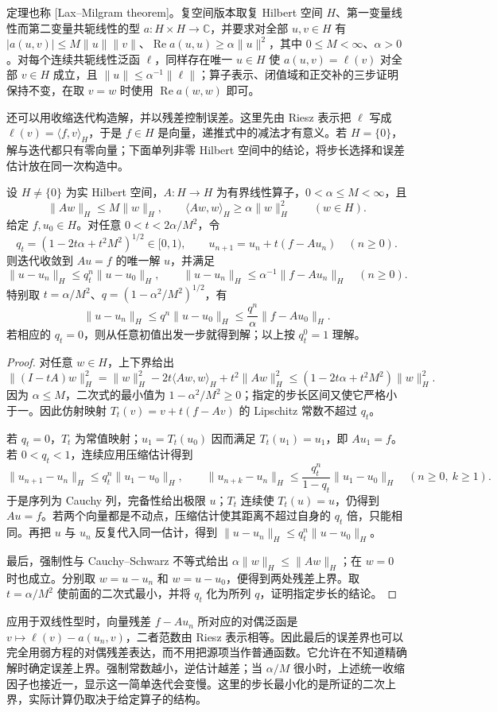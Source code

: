 定理也称 [Lax--Milgram theorem]。复空间版本取复 Hilbert 空间 \(H\)、第一变量线性而第二变量共轭线性的型 \(a:H\times H\to\mathbb C\)，并要求对全部 \(u,v\in H\) 有 \(|a(u,v)|\le M\|u\|\|v\|\)、\(\operatorname{Re}a(u,u)\ge\alpha\|u\|^2\)，其中 \(0\le M<\infty\)、\(\alpha>0\)。对每个连续共轭线性泛函 \(\ell\)，同样存在唯一 \(u\in H\) 使 \(a(u,v)=\ell(v)\) 对全部 \(v\in H\) 成立，且 \(\|u\|\le\alpha^{-1}\|\ell\|\)；算子表示、闭值域和正交补的三步证明保持不变，在取 \(v=w\) 时使用 \(\operatorname{Re}a(w,w)\) 即可。

\ProseParagraphBreak

还可以用收缩迭代构造解，并以残差控制误差。这里先由 Riesz 表示把 \(\ell\) 写成 \(\ell(v)=\langle f,v\rangle_H\)，于是 \(f\in H\) 是向量，递推式中的减法才有意义。若 \(H=\{0\}\)，解与迭代都只有零向量；下面单列非零 Hilbert 空间中的结论，将步长选择和误差估计放在同一次构造中。

\begin{proposition}[收缩迭代与残差估计]
\label{b2:prop:15-contraction-residual}
设 \(H\ne\{0\}\) 为实 Hilbert 空间，\(A:H\to H\) 为有界线性算子，\(0<\alpha\leq M<\infty\)，且
\[
 \|Aw\|_H\leq M\|w\|_H,\qquad
 \langle Aw,w\rangle_H\geq\alpha\|w\|_H^2
 \qquad(w\in H).
\]
给定 \(f,u_0\in H\)。对任意 \(0<t<2\alpha/M^2\)，令
\[
 q_t=(1-2t\alpha+t^2M^2)^{1/2}\in[0,1),\qquad
 u_{n+1}=u_n+t(f-Au_n)\quad(n\geq0).
\]
则迭代收敛到 \(Au=f\) 的唯一解 \(u\)，并满足
\[
 \|u-u_n\|_H\leq q_t^n\|u-u_0\|_H,\qquad
 \|u-u_n\|_H\leq\alpha^{-1}\|f-Au_n\|_H
 \quad(n\geq0).
\]
特别取 \(t=\alpha/M^2\)、\(q=(1-\alpha^2/M^2)^{1/2}\)，有
\[
 \|u-u_n\|_H\leq q^n\|u-u_0\|_H
               \leq\frac{q^n}{\alpha}\|f-Au_0\|_H.
\]
若相应的 \(q_t=0\)，则从任意初值出发一步就得到解；以上按 \(q_t^0=1\) 理解。
\end{proposition}
\begin{proof}
对任意 \(w\in H\)，上下界给出
\[
 \|(I-tA)w\|_H^2
 =\|w\|_H^2-2t\langle Aw,w\rangle_H+t^2\|Aw\|_H^2
 \leq(1-2t\alpha+t^2M^2)\|w\|_H^2.
\]
因为 \(\alpha\leq M\)，二次式的最小值为 \(1-\alpha^2/M^2\geq0\)；指定的步长区间又使它严格小于一。因此仿射映射
\(T_t(v)=v+t(f-Av)\) 的 Lipschitz 常数不超过 \(q_t\)。

若 \(q_t=0\)，\(T_t\) 为常值映射；\(u_1=T_t(u_0)\) 因而满足 \(T_t(u_1)=u_1\)，即 \(Au_1=f\)。若 \(0<q_t<1\)，连续应用压缩估计得到
\[
 \|u_{n+1}-u_n\|_H\leq q_t^n\|u_1-u_0\|_H,\qquad
 \|u_{n+k}-u_n\|_H
 \leq\frac{q_t^n}{1-q_t}\|u_1-u_0\|_H
 \quad(n\geq0,\ k\geq1).
\]
于是序列为 Cauchy 列，完备性给出极限 \(u\)；\(T_t\) 连续使 \(T_t(u)=u\)，仍得到 \(Au=f\)。若两个向量都是不动点，压缩估计使其距离不超过自身的 \(q_t\) 倍，只能相同。再把 \(u\) 与 \(u_n\) 反复代入同一估计，得到 \(\|u-u_n\|_H\leq q_t^n\|u-u_0\|_H\)。

最后，强制性与 Cauchy--Schwarz 不等式给出
\(\alpha\|w\|_H\leq\|Aw\|_H\)；在 \(w=0\) 时也成立。分别取 \(w=u-u_n\) 和 \(w=u-u_0\)，便得到两处残差上界。取 \(t=\alpha/M^2\) 使前面的二次式最小，并将 \(q_t\) 化为所列 \(q\)，证明指定步长的结论。
\end{proof}

应用于双线性型时，向量残差 \(f-Au_n\) 所对应的对偶泛函是
\(v\mapsto\ell(v)-a(u_n,v)\)，二者范数由 Riesz 表示相等。因此最后的误差界也可以完全用弱方程的对偶残差表达，而不用把源项当作普通函数。它允许在不知道精确解时确定误差上界。强制常数越小，逆估计越差；当 \(\alpha/M\) 很小时，上述统一收缩因子也接近一，显示这一简单迭代会变慢。这里的步长最小化的是所证的二次上界，实际计算仍取决于给定算子的结构。
